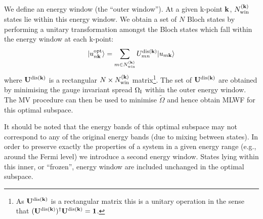 We define an energy window (the ``outer window''). At a given
k-point $\bf{k}$, $N^{({\bf k})}_{{\rm win}}$ states lie within this
energy window. We obtain a set of $N$ Bloch states by
performing a unitary transformation amongst the Bloch states which
fall within the energy window at each k-point: 
 \begin{equation}
| u_{n{\bf k}}^{{\rm opt}}\rangle = \sum_{m\in N^{({\bf k})}_{{\rm win}}}
U^{{\rm dis}({\bf k})}_{mn} | u_{m{\bf k}}\rangle
\end{equation}
where $\bf{U}^{{\rm dis}({\bf k})}$ is a rectangular $N \times N^{({\bf k})}_{{\rm win}}$
 matrix\footnote{As $\bf{U}^{{\rm dis}({\bf k})}$ is a rectangular
 matrix this is a unitary operation in the sense that $(\bf{U}^{{\rm
 dis}({\bf k})})^{\dagger}\bf{U}^{{\rm dis}({\bf k})}=\bf{1}$.}. The
 set of $\bf{U}^{{\rm dis}({\bf k})}$ are obtained by minimising 
 the gauge invariant spread $\Omega_{{\rm I}}$ within the outer energy
 window. The MV procedure can then be used to minimise $\tilde{\Omega}$
 and hence obtain MLWF for this optimal subspace.

It should be noted that the energy bands of this optimal subspace may
not correspond to any of the original energy bands (due to mixing
between states). In order to preserve exactly the properties of a
system in a given energy range (e.g., around the Fermi level) we
introduce a second  energy window. States lying within this inner, or
``frozen'', energy window are included unchanged in the optimal
subspace.
